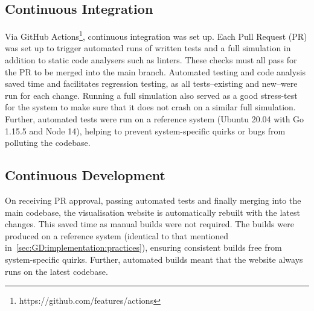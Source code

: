 \subsection{Continuous Integration}
\label{sec:GD:implementation:practices:CI}

Via GitHub Actions\footnote{https://github.com/features/actions}, continuous integration was set up. Each Pull Request (PR) was set up to trigger automated runs of written tests and a full simulation in addition to static code analysers such as linters. These checks must all pass for the PR to be merged into the main branch. Automated testing and code analysis saved time and facilitates regression testing, as all tests--existing and new--were run for each change. Running a full simulation also served as a good stress-test for the system to make sure that it does not crash on a similar full simulation. Further, automated tests were run on a reference system (Ubuntu 20.04 with Go 1.15.5 and Node 14), helping to prevent system-specific quirks or bugs from polluting the codebase.

\subsection{Continuous Development}

On receiving PR approval, passing automated tests and finally merging into the main codebase, the visualisation website is automatically rebuilt with the latest changes. This saved time as manual builds were not required. The builds were produced on a reference system (identical to that mentioned in~\ref{sec:GD:implementation:practices}), ensuring consistent builds free from system-specific quirks. Further, automated builds meant that the website always runs on the latest codebase.
